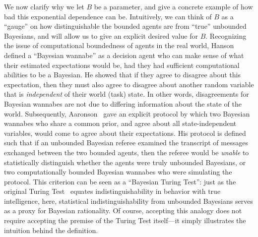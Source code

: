 We now clarify why we let $B$ be a parameter, and give a concrete example of how bad this exponential dependence can be.
Intuitively, we can think of $B$ as a ``gauge'' on how distinguishable the bounded agents are from ``true'' unbounded Bayesians, and will allow us to give an explicit desired value for $B$.
Recognizing the issue of computational boundedness of agents in the real world, Hanson~\citep{hanson2003bayesian} defined a ``Bayesian wannabe'' as a decision agent who can make sense of what their estimated expectations would be, had they had sufficient computational abilities to be a Bayesian.
He showed that if they agree to disagree about this expectation, then they must also agree to disagree about another random variable that is \emph{independent} of their world (task) state.
In other words, disagreements for Bayesian wannabes are not due to differing information about the state of the world.
Subsequently, Aaronson~\citep{aaronson2005complexity} gave an explicit protocol by which two Bayesian wannabes who share a common prior, and agree about all state-independent variables, would come to agree about their expectations.
His protocol is defined such that if an unbounded Bayesian referee examined the transcript of messages exchanged between the two bounded agents, then the referee would be \emph{unable} to statistically distinguish whether the agents were truly unbounded Bayesians, or two computationally bounded Bayesian wannabes who were simulating the protocol.
This criterion can be seen as a ``Bayesian Turing Test'': just as the original Turing Test~\citep{turing1950computing} equates indistinguishability in behavior with true intelligence, here, statistical indistinguishability from unbounded Bayesians serves as a proxy for Bayesian rationality.
Of course, accepting this analogy does not require accepting the premise of the Turing Test itself---it simply illustrates the intuition behind the definition.

